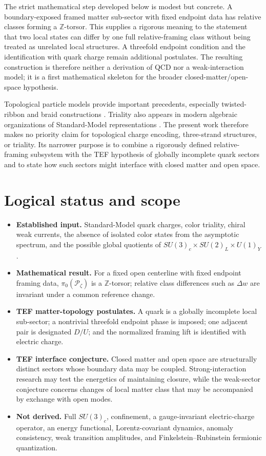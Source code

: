 \documentclass[aps,prd,reprint,superscriptaddress,nofootinbib,longbibliography,floatfix]{revtex4-2}
\begin{document}
The strict mathematical step developed below is modest but concrete. A boundary-exposed framed matter sub-sector with fixed endpoint data has relative classes forming a $\mathbb Z$-torsor. This supplies a rigorous meaning to the statement that two local states can differ by one full relative-framing class without being treated as unrelated local structures. A threefold endpoint condition and the identification with quark charge remain additional postulates. The resulting construction is therefore neither a derivation of QCD nor a weak-interaction model; it is a first mathematical skeleton for the broader closed-matter/open-space hypothesis.

Topological particle models provide important precedents, especially twisted-ribbon and braid constructions \cite{BilsonThompson2005,BilsonThompson2007,Chester2025}. Triality also appears in modern algebraic organizations of Standard-Model representations \cite{FureyHughes2025}. The present work therefore makes no priority claim for topological charge encoding, three-strand structures, or triality. Its narrower purpose is to combine a rigorously defined relative-framing subsystem with the TEF hypothesis of globally incomplete quark sectors and to state how such sectors might interface with closed matter and open space.
\section{Logical status and scope}
\label{sec:ledger}

\begin{itemize}
\item \textbf{Established input.} Standard-Model quark charges, color triality, chiral weak currents, the absence of isolated color states from the asymptotic spectrum, and the possible global quotients of $SU(3)_c\times SU(2)_L\times U(1)_Y$.
\item \textbf{Mathematical result.} For a fixed open centerline with fixed endpoint framing data, $\pi_0(\mathcal P_\zeta)$ is a $\mathbb Z$-torsor; relative class differences such as $\Delta w$ are invariant under a common reference change.
\item \textbf{TEF matter-topology postulates.} A quark is a globally incomplete local sub-sector; a nontrivial threefold endpoint phase is imposed; one adjacent pair is designated $D/U$; and the normalized framing lift is identified with electric charge.
\item \textbf{TEF interface conjecture.} Closed matter and open space are structurally distinct sectors whose boundary data may be coupled. Strong-interaction research may test the energetics of maintaining closure, while the weak-sector conjecture concerns changes of local matter class that may be accompanied by exchange with open modes.
\item \textbf{Not derived.} Full $SU(3)_c$, confinement, a gauge-invariant electric-charge operator, an energy functional, Lorentz-covariant dynamics, anomaly consistency, weak transition amplitudes, and Finkelstein--Rubinstein fermionic quantization.
\end{itemize}
\end{document}
